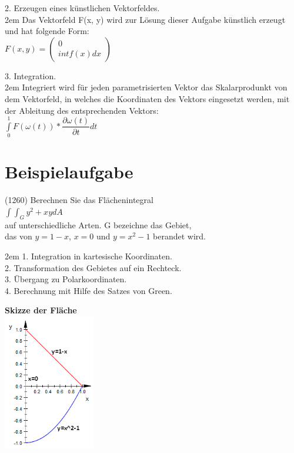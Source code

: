 \documentclass[11pt,final]{scrreprt}
\begin{document}
2. Erzeugen eines künstlichen Vektorfeldes.\\

\begingroup
\leftskip2em 
Das Vektorfeld F(x, y) wird zur Lösung dieser Aufgabe künstlich erzeugt und hat folgende Form:\\

$F(x, y) = \left(\begin{matrix}
0\\ int f(x) dx
\end{matrix}\right)$\\

\par	
\endgroup

3. Integration.\\

\begingroup
\leftskip2em 
Integriert wird für jeden parametrisierten Vektor das Skalarprodunkt von dem Vektorfeld, in welches die Koordinaten des Vektors eingesetzt werden, mit der Ableitung des entsprechenden Vektors:\\

$ \int\limits_0^1 F(\omega(t)) * \dfrac{\partial\omega(t)}{\partial t} dt $\\
\par	
\endgroup

\section{Beispielaufgabe}

(1260) Berechnen Sie das Flächenintegral\\

$ \int\int_G y^2+xy dA $\\

auf unterschiedliche Arten. G bezeichne das Gebiet,\\
das von $y=1-x$, $x=0$ und $y=x^2-1$ berandet wird.

\begingroup
\leftskip2em 
1. Integration in kartesische Koordinaten.\\
2. Transformation des Gebietes auf ein Rechteck.\\
3. Übergang zu Polarkoordinaten.\\
4. Berechnung mit Hilfe des Satzes von Green.\\
\par	
\endgroup

\textbf{Skizze der Fläche}\\

\includegraphics[width=4cm]{images/flaechenintegral/a1Skizze2.png}\\
\end{document}
